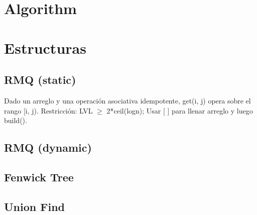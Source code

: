 %


\def\title{El Diego 2.0}
\tableofcontents\newpage
 
\section{Algorithm}%

\section{Estructuras}%
\subsection{RMQ (static)}
Dado un arreglo y una operación asociativa idempotente, get(i, j) opera sobre el rango [i, j). Restricción: LVL $\ge$ 2*ceil(logn); Usar [ ] para llenar arreglo y luego build().
\subsection{RMQ (dynamic)}
\subsection{Fenwick Tree}
\subsection{Union Find}
